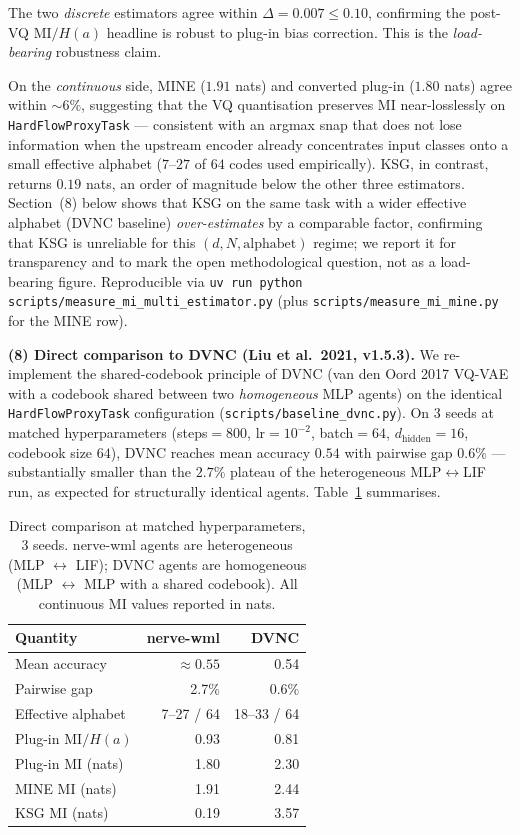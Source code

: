 \documentclass[10pt,twocolumn]{article}
\begin{document}
The two \emph{discrete} estimators agree within
$\Delta = 0.007 \leq 0.10$, confirming the post-VQ
$\mathrm{MI}/H(a)$ headline is robust to plug-in bias correction.
This is the \emph{load-bearing} robustness claim.

On the \emph{continuous} side, MINE ($1.91$ nats) and converted
plug-in ($1.80$ nats) agree within $\sim 6\%$, suggesting that the
VQ quantisation preserves MI near-losslessly on
\texttt{HardFlowProxyTask} --- consistent with an argmax snap
that does not lose information when the upstream encoder already
concentrates input classes onto a small effective alphabet ($7$--$27$
of $64$ codes used empirically). KSG, in contrast, returns $0.19$
nats, an order of magnitude below the other three estimators.
Section~(8) below shows that KSG on the same task with a wider
effective alphabet (DVNC baseline) \emph{over-estimates} by a
comparable factor, confirming that KSG is unreliable for this
\mbox{$(d, N, \text{alphabet})$} regime; we report it for
transparency and to mark the open methodological question, not as
a load-bearing figure. Reproducible via
\texttt{uv run python scripts/measure\_mi\_multi\_estimator.py}
(plus \texttt{scripts/measure\_mi\_mine.py} for the MINE row).

\textbf{(8) Direct comparison to DVNC (Liu et al.\ 2021,
v1.5.3).} We re-implement the shared-codebook principle of DVNC
(van den Oord 2017 VQ-VAE with a codebook shared between two
\emph{homogeneous} MLP agents) on the identical
\texttt{HardFlowProxyTask} configuration
(\texttt{scripts/baseline\_dvnc.py}). On 3 seeds at matched
hyperparameters (steps${=}800$, lr${=}10^{-2}$, batch${=}64$,
$d_{\mathrm{hidden}}{=}16$, codebook size $64$), DVNC reaches
mean accuracy $0.54$ with pairwise gap $0.6\%$ --- substantially
smaller than the $2.7\%$ plateau of the heterogeneous MLP$\leftrightarrow$LIF
run, as expected for structurally identical agents.
Table~\ref{tab:dvnc-compare} summarises.

\begin{table}[t]
  \centering
  \caption{Direct comparison at matched hyperparameters, 3 seeds.
  nerve-wml agents are heterogeneous (MLP $\leftrightarrow$ LIF);
  DVNC agents are homogeneous (MLP $\leftrightarrow$ MLP with a
  shared codebook). All continuous MI values reported in nats.}
  \label{tab:dvnc-compare}
  \small
  \begin{tabular}{lrr}
    \hline
    Quantity & nerve-wml & DVNC \\
    \hline
    Mean accuracy           & $\approx 0.55$ & 0.54 \\
    Pairwise gap            & 2.7\%          & 0.6\% \\
    Effective alphabet      & 7--27 / 64     & 18--33 / 64 \\
    Plug-in $\mathrm{MI}/H(a)$ & 0.93        & 0.81 \\
    Plug-in MI (nats)       & 1.80           & 2.30 \\
    MINE MI (nats)          & 1.91           & 2.44 \\
    KSG MI (nats)           & 0.19           & 3.57 \\
    \hline
  \end{tabular}
\end{table}
\end{document}
